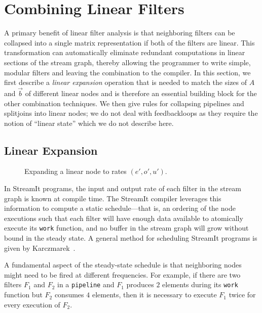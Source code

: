 \section{Combining Linear Filters}
\label{sec:combine}

A primary benefit of linear filter analysis is that neighboring
filters can be collapsed into a single matrix representation if both
of the filters are linear.  This transformation can automatically
eliminate redundant computations in linear sections of the stream
graph, thereby allowing the programmer to write simple, modular
filters and leaving the combination to the compiler.  In this section,
we first describe a {\it linear expansion} operation that is needed to 
match the sizes of $A$ and $\vec{b}$ of different linear nodes and 
is therefore an essential building block for the other combination 
techniques.  We then give rules for collapsing pipelines and 
splitjoins into linear nodes; we do not deal with feedbackloops 
as they require the notion of ``linear state'' which we do 
not describe here.

\subsection{Linear Expansion}

\begin{figure}[t]
\center
\vspace{-12pt}
\epsfxsize=3.2in
\vspace{-12pt}
\caption{Expanding a linear node to rates $(e', o', u')$.  }
\label{fig:expanding-a-matrix}
\vspace{-12pt}
\end{figure}

In StreamIt programs, the input and output rate of each filter in the
stream graph is known at compile time.  The StreamIt compiler
leverages this information to compute a static schedule---that is, an
ordering of the node executions such that each filter will have enough
data available to atomically execute its {\tt work} function, and no
buffer in the stream graph will grow without bound in the steady
state.  A general method for scheduling StreamIt programs is given by
Karczmarek~\cite{karczma-thesis}.

A fundamental aspect of the steady-state schedule is that neighboring
nodes might need to be fired at different frequencies.  For example,
if there are two filters $F_1$ and $F_2$ in a {\tt pipeline} and
$F_1$ produces $2$ elements during its {\tt work} function but $F_2$
consumes $4$ elements, then it is necessary to execute $F_1$ twice for
every execution of $F_2$.

